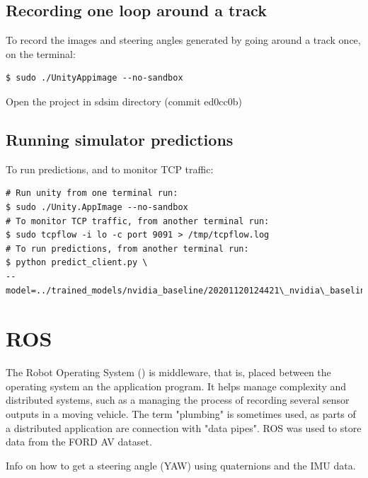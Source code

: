 \subsection{Recording one loop around a track}

To record the images and steering angles generated by going around a track once, on the terminal:
\begin{verbatim}
$ sudo ./UnityAppimage --no-sandbox
\end{verbatim}
Open the project in sdsim directory (commit ed0cc0b)

\subsection{Running simulator predictions}
\label{running-simulator-predictions}

To run predictions, and to monitor TCP traffic:
\begin{verbatim}
# Run unity from one terminal run:
$ sudo ./Unity.AppImage --no-sandbox
# To monitor TCP traffic, from another terminal run:
$ sudo tcpflow -i lo -c port 9091 > /tmp/tcpflow.log
# To run predictions, from another terminal run:
$ python predict_client.py \
--model=../trained_models/nvidia_baseline/20201120124421\_nvidia\_baseline.h5
\end{verbatim}

\section{ROS}
The Robot Operating System (\cite{quigley2009ros}) is middleware, that is, placed between the operating system an the application program. It helps manage complexity and distributed systems, such as a managing the process of recording several sensor outputs in a moving vehicle. The term "plumbing" is sometimes used, as parts of a distributed application are connection with "data pipes".  
ROS was used to store data from the FORD AV dataset.

Info on how to get a steering angle (YAW) using quaternions and the IMU data.

